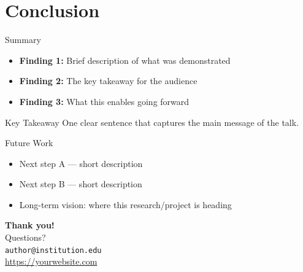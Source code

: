 \section{Conclusion}

\begin{frame}{Summary}
  \begin{itemize}
    \item \textbf{Finding 1:} Brief description of what was demonstrated
    \item \textbf{Finding 2:} The key takeaway for the audience
    \item \textbf{Finding 3:} What this enables going forward
  \end{itemize}

  \vspace{1em}
  \begin{block}{Key Takeaway}
    One clear sentence that captures the main message of the talk.
  \end{block}
\end{frame}

\begin{frame}{Future Work}
  \begin{itemize}
    \item Next step A — short description
    \item Next step B — short description
    \item Long-term vision: where this research/project is heading
  \end{itemize}
\end{frame}

{
\begin{frame}[plain]
  \centering
  \vspace{3em}
  {\LARGE\color{white}\textbf{Thank you!}}\\[1.5em]
  {\large\color{white!80} Questions?}\\[2em]
  {\normalsize\color{white!70}
    \texttt{author@institution.edu}\\[0.3em]
    \url{https://yourwebsite.com}
  }
\end{frame}
}
